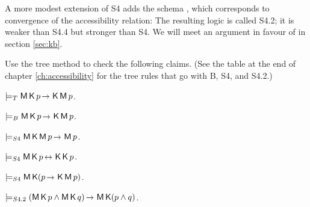 \newpage

A more modest extension of S4 adds the schema , which corresponds to
convergence of the accessibility relation:
%
%
The resulting logic is called S4.2; it is weaker than S4.4 but stronger than S4.
We will meet an argument in favour of  in section \ref{sec:kb}.


\begin{exercise}
  Use the tree method to check the following claims. (See the table at the end
  of chapter \ref{ch:accessibility} for the tree rules that go with B, S4, and
  S4.2.)
  \begin{exlist}
  \item $\models_{T} \Mi\Kn p \to \Kn\Mi p$.
  \item $\models_{B} \Mi\Kn p \to \Kn\Mi p$.
  \item $\models_{S4} \Mi\Kn\Mi p \to \Mi p$.
  \item $\models_{S4} \Mi\Kn p \leftrightarrow \Kn\Kn p$.
  \item $\models_{S4} \Mi\Kn(p \to \Kn\Mi p)$.
  \item $\models_{S4.2} (\Mi\Kn p \land \Mi\Kn q) \to \Mi \Kn(p \land q)$.
  \end{exlist}
\end{exercise}
